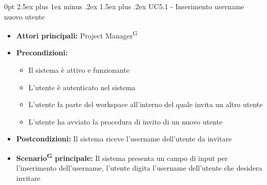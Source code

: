 \documentclass[a4paper, 11pt]{article}
\makeatletter
\renewcommand\paragraph{\@startsection{paragraph}{4}
  {0pt}
  {2.5ex plus 1ex minus .2ex}
  {1.5ex plus .2ex}
  {\normalfont\normalsize\bfseries\color{AccentDark}}}
\makeatother
\begin{document}
\paragraph{UC5.1 - Inserimento username nuovo utente}\label{UC5.1}
\begin{itemize}
	\item \textbf{Attori principali:} Project Manager\textsuperscript{G}
	\item \textbf{Precondizioni:}
	\begin{itemize}
		\item Il sistema è attivo e funzionante
		\item L'utente è autenticato nel sistema
        \item L'utente fa parte del workspace all'interno del quale invita un altro utente
        \item L'utente ha avviato la procedura di invito di un nuovo utente
	\end{itemize}
    \item \textbf{Postcondizioni:} Il sistema riceve l'username dell'utente da invitare
	\item \textbf{Scenario\textsuperscript{G} principale:} Il sistema presenta un campo di input per l'inserimento dell'username, l'utente digita l'username dell'utente che desidera invitare

\end{itemize}
\end{document}
